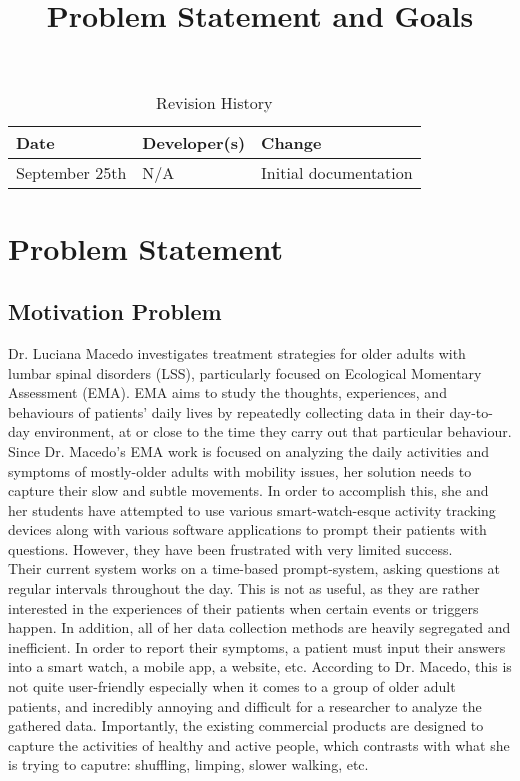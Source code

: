 \documentclass{article}
\title{Problem Statement and Goals\\\progname}
\author{\authname}
\date{}
\begin{document}
\maketitle

\begin{table}[hp]
    \caption{Revision History} \label{TblRevisionHistory}
    \begin{tabularx}{\textwidth}{llX}
        \toprule
        \textbf{Date}  & \textbf{Developer(s)} & \textbf{Change}       \\
        \midrule
        September 25th & N/A                   & Initial documentation \\
        \bottomrule
    \end{tabularx}
\end{table}

\newpage

\section{Problem Statement}

\subsection{Motivation Problem}

Dr. Luciana Macedo investigates treatment strategies for older adults with  lumbar spinal disorders (LSS), particularly focused on Ecological Momentary Assessment (EMA). EMA aims to study the thoughts, experiences, and behaviours of patients' daily lives by repeatedly collecting data in their day-to-day environment, at or close to the time they carry out that particular behaviour.\\

Since Dr. Macedo's EMA work is focused on analyzing the daily activities and symptoms of mostly-older adults with mobility issues, her solution needs to capture their slow and subtle movements. In order to accomplish this, she and her students have attempted to use various smart-watch-esque activity tracking devices along with various software applications to prompt their patients with questions. However, they have been frustrated with very limited success.\\

Their current system works on a time-based prompt-system, asking questions at regular intervals throughout the day. This is not as useful, as they are rather interested in the experiences of their patients when certain events or triggers happen. In addition, all of her data collection methods are heavily segregated and inefficient. In order to report their symptoms, a patient must input their answers into a smart watch, a mobile app, a website, etc. According to Dr. Macedo, this is not quite user-friendly especially when it comes to a group of older adult patients, and incredibly annoying and difficult for a researcher to analyze the gathered data. Importantly, the existing commercial products are designed to capture the activities of healthy and active people, which contrasts with what she is trying to caputre: shuffling, limping, slower walking, etc.\\
\end{document}
